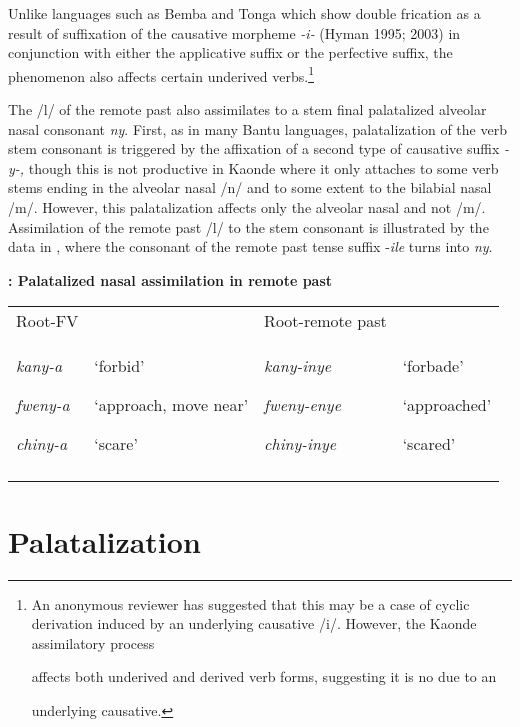 \documentclass[output=paper]{langsci/langscibook}
\begin{document}
Unlike languages such as Bemba and Tonga which show double frication as a result of suffixation of the causative morpheme \emph{{}-i-} (Hyman 1995; 2003) in conjunction with either the applicative suffix or the perfective suffix, the phenomenon also affects certain underived verbs.\footnote{ An anonymous reviewer has suggested that this may be a case of cyclic derivation      induced by an underlying causative /i/. However, the Kaonde assimilatory process\par       affects both underived and derived verb forms, suggesting it is no due to an\par       underlying causative.\par }


The /l/ of the remote past also assimilates to a stem final palatalized alveolar nasal consonant \emph{ny}. First, as in many Bantu languages, palatalization of the verb stem consonant is triggered by the affixation of a second type of causative suffix \emph{{}-y-}\emph{\textup{,}} though this is not productive in Kaonde where it only attaches to some verb stems ending in the alveolar nasal /n/ and to some extent to the bilabial nasal /m/. However, this palatalization affects only the alveolar nasal and not /m/. Assimilation of the remote past /l/ to the stem consonant is illustrated by the data in , where the consonant of the remote past tense suffix -\emph{ile } turns into \emph{ny}.  



\textbf{: Palatalized nasal assimilation in remote past}


\begin{tabularx}{\textwidth}{XXXX}
\lsptoprule
Root-FV &  & Root-remote past & \\
{\emph{kany-a }}

{\emph{fweny-a }}

\emph{chiny-a} & {‘forbid’}

{‘approach, move near’}

‘scare’ & {\emph{kany-inye}}

{\emph{fweny-enye}}

\emph{chiny-inye} & {‘forbade’}

{‘approached’}

‘scared’\\
\lspbottomrule
\end{tabularx}
\section{Palatalization}
\end{document}
